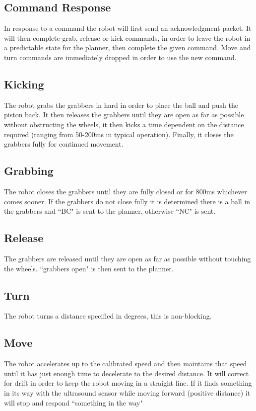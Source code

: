 \subsection{Command Response}
In response to a command the robot will first send an acknowledgment packet. It will then complete grab, release or kick commands, in order to leave the robot in a predictable state for the planner, then complete the given command. Move and turn commands are immediately dropped in order to use the new command. 

\subsection{Kicking}
The robot grabs the grabbers in hard in order to place the ball and push the piston back. It then releases the grabbers until they are open as far as possible without obstructing the wheels, it then kicks a time dependent on the distance required (ranging from 50-200ms in typical operation). Finally, it closes the grabbers fully for continued movement.

\subsection{Grabbing}
The robot closes the grabbers until they are fully closed or for 800ms whichever comes sooner. If the grabbers do not close fully it is determined there is a ball in the grabbers and ``BC" is sent to the planner, otherwise ``NC" is sent.  

\subsection{Release}
The grabbers are released until they are open as far as possible without touching the wheels. ``grabbers open" is then sent to the planner. 

\subsection{Turn}
The robot turns a distance specified in degrees, this is non-blocking. 

\subsection{Move}
The robot accelerates up to the calibrated speed and then maintains that speed until it has just enough time to decelerate to the desired distance. It will correct for drift in order to keep the robot moving in a straight line. If it finds something in its way with the ultrasound sensor while moving forward (positive distance) it will stop and respond ``something in the way"

